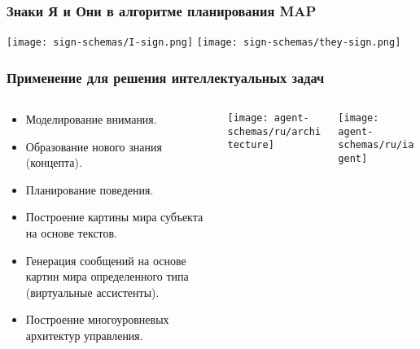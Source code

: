\documentclass[default]{beamer}
\begin{document}
	\begin{frame}
		\frametitle{Знаки Я и Они в алгоритме планирования MAP}
		
		\begin{center}
		\texttt{[image: sign-schemas/I-sign.png]}
		\texttt{[image: sign-schemas/they-sign.png]}
		\end{center}

	\end{frame}

	\begin{frame}
		\frametitle{Применение для решения интеллектуальных задач}
		\vspace{-5pt}
		\footnotesize
		\begin{columns}
		\begin{column}{0.5\textwidth}
		\begin{itemize}
		\item Моделирование внимания.
		\item Образование нового знания (концепта).
		\item Планирование поведения.
		\item Построение картины мира субъекта на основе текстов.
		\item Генерация сообщений на основе картин мира определенного типа (виртуальные ассистенты).
		\item Построение многоуровневых архитектур управления.
		\end{itemize}
		
		\end{column}
		\begin{column}{0.35\textwidth}
		\texttt{[image: agent-schemas/ru/architecture]}
		\end{column}
		\begin{column}{0.15\textwidth}
		\texttt{[image: agent-schemas/ru/iagent]}
		\end{column}
		
		\end{columns}

	\end{frame}

		
\end{document}
